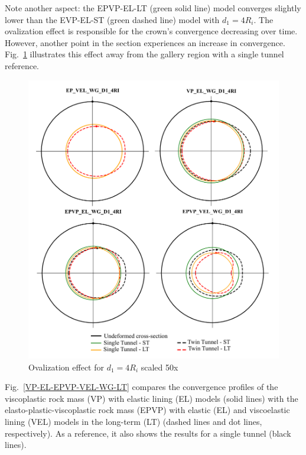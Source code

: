 \documentclass[a4paper,fleqn]{cas-sc}
\begin{document}
Note another aspect: the EPVP-EL-LT (green solid line) model converges slightly lower than the EVP-EL-ST (green dashed line) model with $d_1 = 4R_i$. The ovalization effect is responsible for the crown's convergence decreasing over time. However, another point in the section experiences an increase in convergence. Fig.~\ref{ovalization} illustrates this effect away from the gallery region with a single tunnel reference.
\begin{figure}[h!]
	\centering
	\includegraphics[scale=0.5]{ovalization.pdf}
	\caption{Ovalization effect for $d_1 = 4R_i$ scaled 50x}
	\label{ovalization}
\end{figure}
\FloatBarrier
Fig.~\ref{VP-EL-EPVP-VEL-WG-LT} compares the convergence profiles of the viscoplastic rock mass (VP) with elastic lining (EL) models (solid lines) with the elasto-plastic-viscoplastic rock mass (EPVP) with elastic (EL) and viscoelastic lining (VEL) models in the long-term (LT) (dashed lines and dot lines, respectively). As a reference, it also shows the results for a single tunnel (black lines).
\end{document}
